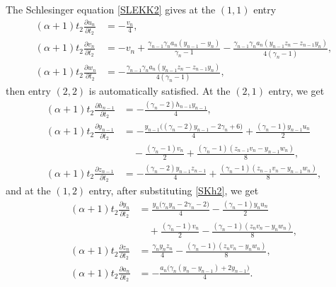 \documentclass[10pt, reqno]{amsart}
\numberwithin{equation}{section}
\numberwithin{equation}{section}
\begin{document}
The Schlesinger equation \eqref{SLEKK2} gives at the $(1,1)$ entry
\begin{align}
(\alpha+1)t_2\frac{\partial u_n}{\partial t_2}&=-\frac{v_n}{4},\label{SKu2}\\
(\alpha+1)t_2\frac{\partial v_n}{\partial t_2}&=-v_n+\frac{\gamma_{n-1}\gamma_na_n(y_{n-1}-y_n)}{\gamma_n-1}
-\frac{\gamma_{n-1}\gamma_na_n(y_{n-1}z_n-z_{n-1}y_n)}{4(\gamma_n-1)},\nonumber\\
(\alpha+1)t_2\frac{\partial w_n}{\partial t_2}&=-\frac{\gamma_{n-1}\gamma_na_n(y_{n-1}z_n-z_{n-1}y_n)}{4(\gamma_n-1)},\nonumber
\end{align}
then entry $(2,2)$ is automatically satisfied. At the $(2,1)$ entry, we get
\begin{align}
(\alpha+1)t_2\frac{\partial h_{n-1}}{\partial t_2}&=-\frac{(\gamma_n-2)h_{n-1}y_{n-1}}{4},\label{SKh2}\\
(\alpha+1)t_2\frac{\partial y_{n-1}}{\partial t_2}&=-\frac{y_{n-1}\big((\gamma_n-2)y_{n-1}-2\gamma_n+6\big)}{4}+\frac{(\gamma_n-1)y_{n-1}u_n}{2}\nonumber\\
&\quad -\frac{(\gamma_n-1)v_n}{2}+\frac{(\gamma_n-1)(z_{n-1}v_n-y_{n-1}w_n)}{8},\nonumber\\
(\alpha+1)t_2\frac{\partial z_{n-1}}{\partial t_2}&=-\frac{(\gamma_n-2)y_{n-1}z_{n-1}}{4}+\frac{(\gamma_n-1)(z_{n-1}v_n-y_{n-1}w_n)}{8},\nonumber
\end{align}
and at the $(1,2)$ entry, after substituting \eqref{SKh2}, we get
\begin{align}
(\alpha+1)t_2\frac{\partial y_n}{\partial t_2}&=\frac{y_n\big(\gamma_ny_n-2\gamma_n-2)}{4}-\frac{(\gamma_n-1)y_nu_n}{2}\nonumber\\
&\quad +\frac{(\gamma_n-1)v_n}{2}-\frac{(\gamma_n-1)(z_nv_n-y_nw_n)}{8},\label{SKy2}\\
(\alpha+1)t_2\frac{\partial z_n}{\partial t_2}&=\frac{\gamma_ny_nz_n}{4}-\frac{(\gamma_n-1)(z_nv_n-y_nw_n)}{8},\label{SKz2}\\
(\alpha+1)t_2\frac{\partial a_n}{\partial t_2}&=-\frac{a_n\big(\gamma_n(y_n-y_{n-1})+2y_{n-1}\big)}{4}.\label{SKa2}
\end{align}
\end{document}
